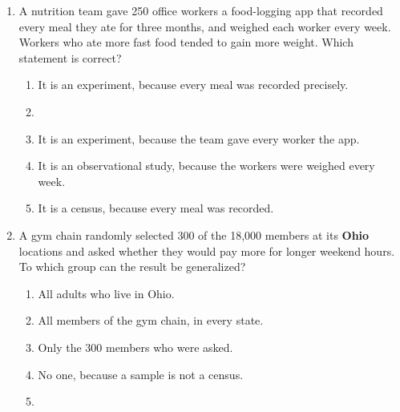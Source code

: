 \documentclass[12pt]{article}
\begin{document}
\begin{enumerate}[leftmargin=1.9em, itemsep=0.13in]

  \boxguard[11]
  \item A nutrition team gave 250 office workers a food-logging app that recorded every meal they
        ate for three months, and weighed each worker every week. Workers who ate more fast food
        tended to gain more weight. Which statement is correct?
        \begin{enumerate}[label=\textbf{(\Alph*)}, leftmargin=2.2em, itemsep=2pt]
          \item It is an experiment, because every meal was recorded precisely.
          \item {}
          \item It is an experiment, because the team gave every worker the app.
          \item It is an observational study, because the workers were weighed every week.
          \item It is a census, because every meal was recorded.\hfill{}\rule[-0.2in]{0pt}{0.48in}
        \end{enumerate}

  \boxguard[11]
  \item A gym chain randomly selected 300 of the 18{,}000 members at its \textbf{Ohio} locations
        and asked whether they would pay more for longer weekend hours. To which group can the
        result be generalized?
        \begin{enumerate}[label=\textbf{(\Alph*)}, leftmargin=2.2em, itemsep=2pt]
          \item All adults who live in Ohio.
          \item All members of the gym chain, in every state.
          \item Only the 300 members who were asked.
          \item No one, because a sample is not a census.
          \item {}\hfill{}\rule[-0.2in]{0pt}{0.48in}
        \end{enumerate}


\end{enumerate}
\end{document}
